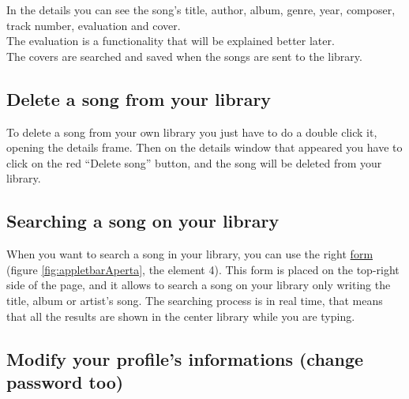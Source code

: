 In the details you can see the song's title, author, album, genre, year,
composer, track number, evaluation and cover.\\
The evaluation is a functionality that will be explained better later.\\
The covers are searched and saved when the songs are sent to the library.

\subsection{Delete a song from your library}

To delete a song from your own library you just have to do a double click it, opening 
the details frame. Then on the details window that appeared you have to
click on the red ``Delete song'' button, and the song will be deleted from your
library.

\subsection{Searching a song on your library}

When you want to search a song in your library, you can use the right
\underline{form} (figure \ref{fig:appletbarAperta}, the element 4). This form is
placed on the top-right side of the page, and it allows to search a song on your
library only writing the title, album or artist's song. The searching process
is in real time, that means that all the results are shown in the center
library while you are typing.

\subsection{Modify your profile's informations (change password too)}

